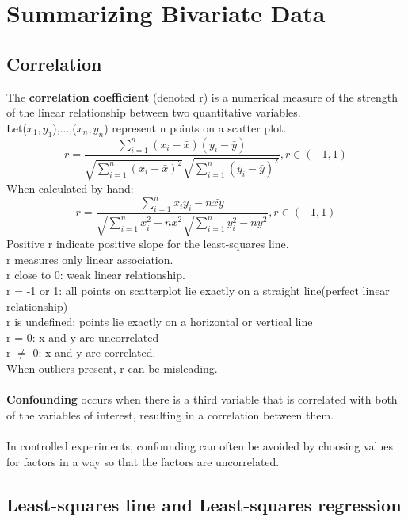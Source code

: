 \documentclass[../main.tex]{subfiles}
\begin{document}
\section{Summarizing Bivariate Data}
\subsection{Correlation}
The \textbf{correlation coefficient} (denoted r) is a numerical measure of the strength of the linear relationship between two quantitative variables.\\
Let($x_1,y_1$),...,($x_n,y_n$) represent n points on a scatter plot.
\begin{equation*}
    r = \frac{\displaystyle\sum_{i=1}^{n}{(x_i-\bar{x})(y_i-\bar{y})}}{\displaystyle\sqrt{\sum_{i=1}^{n}(x_i-\bar{x})^2} \sqrt{\sum_{i=1}^{n}(y_i-\bar{y})^2}}, r\in(-1,1)
\end{equation*}
When calculated by hand:
\begin{equation*}
    r = \frac{\displaystyle\sum_{i=1}^{n}{x_i y_i-n\bar{xy}}}{\displaystyle\sqrt{\sum_{i=1}^{n} x_i^2-n\bar{x}^2 }\sqrt{\sum_{i=1}^{n}y_i ^2-n\bar{y}^2}}, r\in(-1,1)
\end{equation*}
Positive r indicate positive slope for the least-squares line.\\
r measures only linear association.\\
r close to 0: weak linear relationship.\\
r = -1 or 1: all points on scatterplot lie exactly on a straight line(perfect linear relationship)\\
r is undefined: points lie exactly on a horizontal or vertical line\\
r = 0: x and y are uncorrelated\\
r $\neq$ 0: x and y are correlated.\\
When outliers present, r can be misleading.
\\\\
\textbf{Confounding} occurs when there is a third variable that is correlated with both of the variables of interest, resulting in a correlation between them.
\\\\
In controlled experiments, confounding can often be avoided by choosing values for factors in a way so that the factors are uncorrelated.

\subsection{Least-squares line and Least-squares regression}
\end{document}
